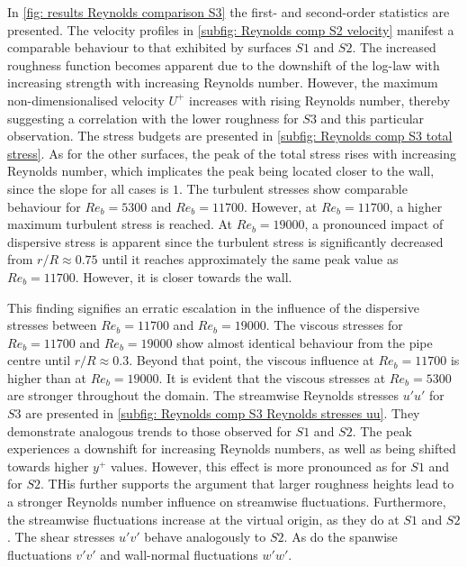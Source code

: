 In \autoref{fig: results Reynolds comparison S3} the first- and second-order statistics are presented.
The velocity profiles in \autoref{subfig: Reynolds comp S2 velocity} manifest  a comparable behaviour to that exhibited by surfaces $S1$ and $S2$.
The increased roughness function becomes apparent due to the downshift of the log-law with increasing strength with increasing Reynolds number.
However, the maximum non-dimensionalised velocity $U^+$ increases with rising Reynolds number, thereby suggesting a correlation with the lower roughness for $S3$ and this particular observation.
The stress budgets are presented in \autoref{subfig: Reynolds comp S3 total stress}.
As for the other surfaces, the peak of the total stress rises with increasing Reynolds number, which implicates the peak being located closer to the wall, since the slope for all cases is $1$.
The turbulent stresses show comparable behaviour for $Re_b = 5300$ and $Re_b = 11700$.
However, at $Re_b = 11700$, a higher maximum turbulent stress is reached.
At $Re_b = 19000$, a pronounced impact of dispersive stress is apparent since the turbulent stress is significantly decreased from $r/R \approx 0.75$ until it reaches approximately the same peak value as $Re_b = 11700$. However, it is closer towards the wall.

This finding signifies an erratic escalation in  the influence of the dispersive stresses between $Re_b = 11700$ and $Re_b = 19000$.
The viscous stresses for $Re_b = 11700$ and $Re_b = 19000$ show almost identical behaviour from the pipe centre until $r/R \approx 0.3$.
Beyond that point, the viscous influence at $Re_b = 11700$ is higher than at $Re_b = 19000$.
It is evident that the viscous stresses at $Re_b = 5300$ are stronger throughout the domain.
The streamwise Reynolds stresses $u'u'$ for $S3$  are presented in \autoref{subfig: Reynolds comp S3 Reynolds stresses uu}. They demonstrate analogous trends to those observed for $S1$ and $S2$.
The peak experiences a downshift for increasing Reynolds numbers, as well as being shifted towards higher $y^+$ values.
However, this effect is more pronounced as for $S1$ and for $S2$. THis further supports the argument that larger roughness heights lead to a stronger Reynolds number influence on streamwise fluctuations.
Furthermore, the streamwise fluctuations increase at the virtual origin, as they do at $S1$ and $S2$.
The shear stresses $u'v'$ behave analogously to $S2$.
As do the spanwise fluctuations $v'v'$ and wall-normal fluctuations $w'w'$.

